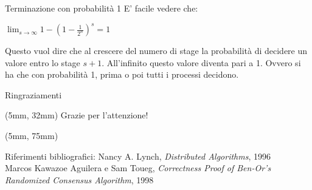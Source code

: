 \documentclass{beamer}
\begin{document}
\begin{frame}{Terminazione con probabilità 1}
    E' facile vedere che:
    \begin{center}
        \Large
        $\lim_{s\to\infty} 1 - (1 - \frac{1}{2^n})^s = 1$
    \end{center}
    Questo vuol dire che al crescere del numero di stage la probabilità di decidere un valore entro lo stage $s+1$. \newline \newline
    All'infinito questo valore diventa pari a 1. Ovvero si ha che con probabilità 1, prima o poi tutti i processi decidono.
\end{frame}

{
    \beamertemplatenavigationsymbolsempty
    \begin{frame}{Ringraziamenti}
    \begin{textblock*}{\textwidth}(5mm, 32mm)
        \Huge Grazie per l'attenzione!
    \end{textblock*}
    \begin{textblock*}{0.6\textwidth}(5mm, 75mm)
        \begin{block}{Riferimenti bibliografici:}
            \tiny Nancy A. Lynch, \textit{Distributed Algorithms}, 1996 \\
            Marcos Kawazoe Aguilera e Sam Toueg, \textit{Correctness Proof of Ben-Or’s Randomized Consensus Algorithm}, 1998
        \end{block}
    \end{textblock*}
    \end{frame}
    \addtocounter{framenumber}{-1}
}
\end{document}
